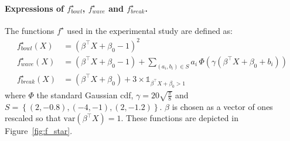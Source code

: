 \documentclass{article}
\newcommand{\br}[1]{\left(#1\right)}
\newcommand{\cbr}[1]{\left\{#1\right\}}
\theoremstyle{plain}
\begin{document}
\paragraph{Expressions of $f^\star_{bowl}$, $f^\star_{wave}$ and $f^\star_{break}$.}
The functions $f^\star$ used in the experimental study are defined as:
\begin{align*}
    f^\star_{bowl}(X) &= \br{\beta^\top X + \beta_0 -1}^2\\
    f^\star_{wave}(X) &= (\beta^\top X +\beta_0 -1) + \sum_{(a_i, b_i) \in S} a_i\,\Phi\br{\gamma \br{\beta^\top X + \beta_0 + b_i}}\\
    f^\star_{break}(X) &= \br{\beta^\top X + \beta_0} + 3 \times \mathds{1}_{\beta^\top X + \beta_0 > 1}
\end{align*}
where $\Phi$ the standard Gaussian cdf, $\gamma = 20 \sqrt{\frac{\pi}{8}}$ and $S = \cbr{(2, -0.8), (-4, -1), (2, -1.2)}$. $\beta$ is chosen as a vector of ones rescaled so that $\text{var}(\beta^\top X) = 1$. These functions are depicted in Figure~\ref{fig:f_star}. 
\end{document}
